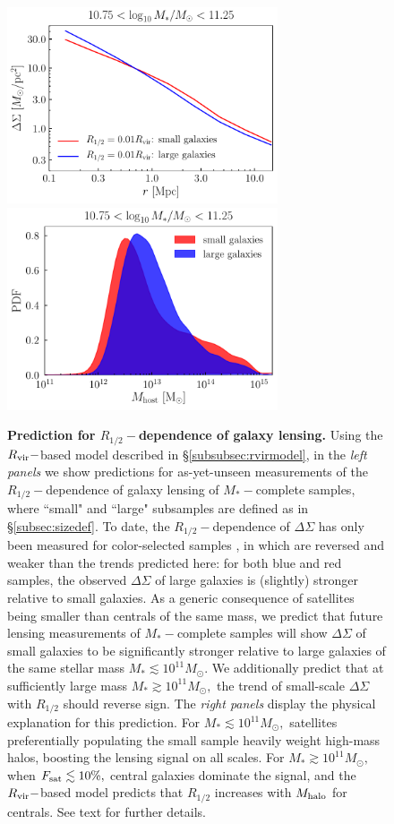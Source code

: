 \documentclass[usenatbib,usegraphicx,letterpaper]{mn2e}
\newcommand{\rhalf}{R_{1/2}}
\newcommand{\mstar}{M_{\ast}}
\newcommand{\mhalo}{M_{\rm halo}}
\newcommand{\rvir}{R_{\rm vir}}
\newcommand{\msun}{M_\odot}
\begin{document}
\begin{figure}
\includegraphics[width=8cm]{FIGS/rvir_only_lensing_prediction3.pdf}
\includegraphics[width=8cm]{FIGS/host_mass_distributions_sm10p75_sm11p25.pdf}
\caption{
{\bf Prediction for $\rhalf-$dependence of galaxy lensing.}
Using the $\rvir-$based model described in \S\ref{subsubsec:rvirmodel}, in the {\em left panels} we show predictions for as-yet-unseen measurements of the $\rhalf-$dependence of galaxy lensing of $\mstar-$complete samples, where ``small" and ``large" subsamples are defined as in \S\ref{subsec:sizedef}. To date, the $\rhalf-$dependence of $\Delta\Sigma$ has only been measured for color-selected samples \citep{charlton_etal17}, in which are reversed and weaker than the trends predicted here: for both blue and red samples, the observed $\Delta\Sigma$ of large galaxies is (slightly) stronger relative to small galaxies. As a generic consequence of satellites being smaller than centrals of the same mass, we predict that future lensing measurements of $\mstar-$complete samples will show $\Delta\Sigma$ of small galaxies to be significantly stronger relative to large galaxies of the same stellar mass $\mstar\lesssim10^{11}\msun.$ We additionally predict that at sufficiently large mass $\mstar\gtrsim10^{11}\msun,$ the trend of small-scale $\Delta\Sigma$ with $\rhalf$ should reverse sign. The {\em right panels} display the physical explanation for this prediction. For $\mstar\lesssim10^{11}\msun,$ satellites preferentially populating the small sample heavily weight high-mass halos, boosting the lensing signal on all scales. For $\mstar\gtrsim10^{11}\msun,$ when $F_{\rm sat}\lesssim10\%,$ central galaxies dominate the signal, and the $\rvir-$based model predicts that $\rhalf$ increases with $\mhalo$ for centrals. See text for further details. 
}
\label{fig:lensingprediction}
\end{figure}
\end{document}
